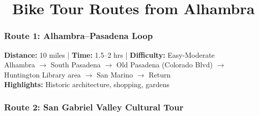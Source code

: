 \documentclass[10pt,letterpaper]{article}
\begin{document}
\newpage


\section*{\faBicycle\ Bike Tour Routes from Alhambra}

\begin{center}
\end{center}

\subsubsection*{Route 1: Alhambra--Pasadena Loop}

\begin{routebox}
\textbf{Distance:} 10 miles | \textbf{Time:} 1.5--2 hrs | \textbf{Difficulty:} Easy-Moderate\\[3pt]
Alhambra $\rightarrow$ South Pasadena $\rightarrow$ Old Pasadena (Colorado Blvd) $\rightarrow$ Huntington Library area $\rightarrow$ San Marino $\rightarrow$ Return\\[3pt]
\textbf{Highlights:} Historic architecture, shopping, gardens
\end{routebox}

\subsubsection*{Route 2: San Gabriel Valley Cultural Tour}
\end{document}
